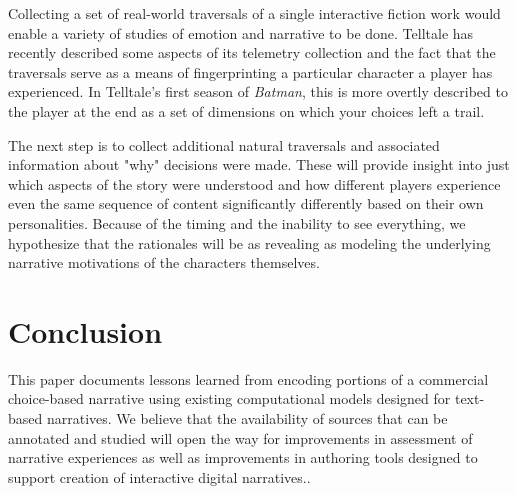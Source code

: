 Collecting a set of real-world traversals of a single interactive
fiction work would enable a variety of studies of emotion and
narrative to be done. Telltale has recently described some aspects of
its telemetry collection and the fact that the traversals serve as a
means of fingerprinting a particular character a player has
experienced. In Telltale's first season of \emph{Batman}, this is more
overtly described to the player at the end as a set of dimensions on
which your choices left a trail.

The next step is to collect additional natural traversals and
associated information about "why" decisions were made. These will
provide insight into just which aspects of the story were understood
and how different players experience even the same sequence of content
significantly differently based on their own personalities. Because of
the timing and the inability to see everything, we hypothesize that
the rationales will be as revealing as modeling the underlying
narrative motivations of the characters themselves.
\section{Conclusion}
\label{sec:orgheadline15}
This paper documents lessons learned from encoding portions of a
commercial choice-based narrative using existing computational models
designed for text-based narratives. We believe that the availability
of sources that can be annotated and studied will open the way for
improvements in assessment of narrative experiences as well as
improvements in authoring tools designed to support creation of
interactive digital narratives..
